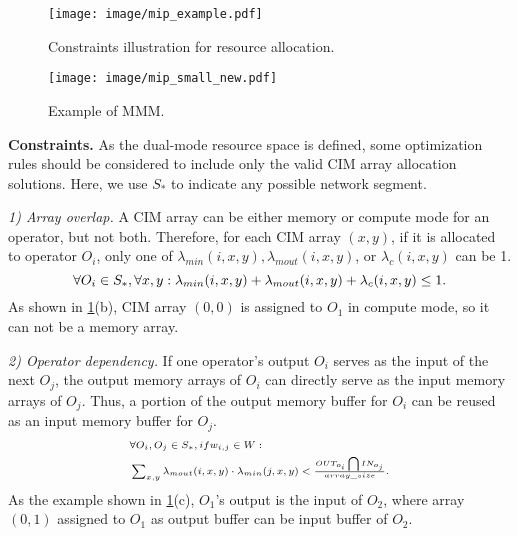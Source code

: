 \begin{figure}[t]
    \centering
    \texttt{[image: image/mip\_example.pdf]}
    \caption{Constraints illustration for resource allocation.}
    \label{fig:cons}
\end{figure}
\begin{figure}[t]
    \centering
    \texttt{[image: image/mip\_small\_new.pdf]}
    \caption{Example of MMM.}
    \label{fig:mip}
\end{figure}
\noindent\textbf{Constraints.}
As the dual-mode resource space is defined, some optimization rules should be considered to include only the valid CIM array allocation solutions.
Here, we use $S_*$ to indicate any possible network segment. 

\textit{1) Array overlap.} A CIM array can be either memory or compute mode for an operator, but not both. Therefore, for each CIM array $(x,y)$, if it is allocated to operator $O_i$, only one of $\lambda_{min}(i,x,y), \lambda_{mout}(i,x,y)$, or $\lambda_{c}(i,x,y)$ can be 1.
\begin{equation}
    \scriptsize\forall O_i \in S_*, \forall x,y: \\
    \lambda_{min}(i,x,y)+\lambda_{mout}(i,x,y)+\lambda_{c}(i,x,y) \leq 1.
\end{equation}
As shown in \fig \ref{fig:cons}(b), CIM array $(0,0)$ is assigned to $O_1$ in compute mode, so it can not be a memory array.

\textit{2) Operator dependency.} If one operator's output $O_i$ serves as the input of the next $O_j$, the output memory arrays of $O_i$ can directly serve as the input memory arrays of $O_j$. Thus, a portion of the output memory buffer for $O_i$ can be reused as an input memory buffer for $O_j$.
\begin{equation}
\scriptsize
\begin{split}
    &\forall O_i,O_j \in S_*, if\space w_{i,j} \in W: \\
    &\textstyle \sum_{x,y} \lambda_{mout}(i,x,y) \cdot \lambda_{min}(j,x,y) < \frac{OUT_{o_i} \bigcap IN_{o_j}}{array\_size}.
\end{split} 
\end{equation}
As the example shown in \fig\ref{fig:cons}(c), 
$O_1$'s output is the input of $O_2$, where array $(0,1)$ assigned to $O_1$ as output buffer can be input buffer of $O_2$.


